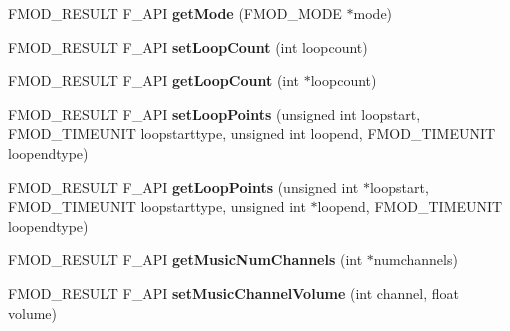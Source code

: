 \begin{DoxyCompactItemize}
\item 
\hypertarget{class_f_m_o_d_1_1_sound_ae8bfe6364a2283c43c21f03d43daafe5}{F\-M\-O\-D\-\_\-\-R\-E\-S\-U\-L\-T F\-\_\-\-A\-P\-I {\bfseries get\-Mode} (F\-M\-O\-D\-\_\-\-M\-O\-D\-E $\ast$mode)}\label{class_f_m_o_d_1_1_sound_ae8bfe6364a2283c43c21f03d43daafe5}

\item 
\hypertarget{class_f_m_o_d_1_1_sound_af5da99ae0aff53b50910a36e3510d7ba}{F\-M\-O\-D\-\_\-\-R\-E\-S\-U\-L\-T F\-\_\-\-A\-P\-I {\bfseries set\-Loop\-Count} (int loopcount)}\label{class_f_m_o_d_1_1_sound_af5da99ae0aff53b50910a36e3510d7ba}

\item 
\hypertarget{class_f_m_o_d_1_1_sound_a8ed3b79d45f937d215a84e52c2be4891}{F\-M\-O\-D\-\_\-\-R\-E\-S\-U\-L\-T F\-\_\-\-A\-P\-I {\bfseries get\-Loop\-Count} (int $\ast$loopcount)}\label{class_f_m_o_d_1_1_sound_a8ed3b79d45f937d215a84e52c2be4891}

\item 
\hypertarget{class_f_m_o_d_1_1_sound_ae4ed822496a4bd387e8384aec67e33f9}{F\-M\-O\-D\-\_\-\-R\-E\-S\-U\-L\-T F\-\_\-\-A\-P\-I {\bfseries set\-Loop\-Points} (unsigned int loopstart, F\-M\-O\-D\-\_\-\-T\-I\-M\-E\-U\-N\-I\-T loopstarttype, unsigned int loopend, F\-M\-O\-D\-\_\-\-T\-I\-M\-E\-U\-N\-I\-T loopendtype)}\label{class_f_m_o_d_1_1_sound_ae4ed822496a4bd387e8384aec67e33f9}

\item 
\hypertarget{class_f_m_o_d_1_1_sound_a6528c2344a8f4b87c1f48bc02a829fc5}{F\-M\-O\-D\-\_\-\-R\-E\-S\-U\-L\-T F\-\_\-\-A\-P\-I {\bfseries get\-Loop\-Points} (unsigned int $\ast$loopstart, F\-M\-O\-D\-\_\-\-T\-I\-M\-E\-U\-N\-I\-T loopstarttype, unsigned int $\ast$loopend, F\-M\-O\-D\-\_\-\-T\-I\-M\-E\-U\-N\-I\-T loopendtype)}\label{class_f_m_o_d_1_1_sound_a6528c2344a8f4b87c1f48bc02a829fc5}

\item 
\hypertarget{class_f_m_o_d_1_1_sound_ae5af50e5bdaec640dceb9a797c75fa99}{F\-M\-O\-D\-\_\-\-R\-E\-S\-U\-L\-T F\-\_\-\-A\-P\-I {\bfseries get\-Music\-Num\-Channels} (int $\ast$numchannels)}\label{class_f_m_o_d_1_1_sound_ae5af50e5bdaec640dceb9a797c75fa99}

\item 
\hypertarget{class_f_m_o_d_1_1_sound_ab5dc7c5f81b8301d9ea74bd0c0d00c49}{F\-M\-O\-D\-\_\-\-R\-E\-S\-U\-L\-T F\-\_\-\-A\-P\-I {\bfseries set\-Music\-Channel\-Volume} (int channel, float volume)}\label{class_f_m_o_d_1_1_sound_ab5dc7c5f81b8301d9ea74bd0c0d00c49}


\end{DoxyCompactItemize}
